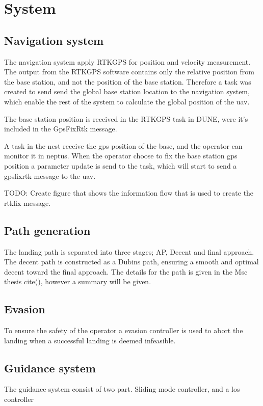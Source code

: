 \chapter{System}

\section{Navigation system}
The navigation system apply RTKGPS for position and velocity measurement. The output from the RTKGPS software contains only the relative position from the base station, and not the position of the base station. Therefore a task was created to send send the global base station location to the navigation system, which enable the rest of the system to calculate the global position of the uav. 

The base station position is received in the RTKGPS task in DUNE, were it's included in the GpsFixRtk message.

A task in the nest receive the gps position of the base, and the operator can monitor it in neptus. When the operator choose to fix the base station gps position a parameter update is send to the task, which will start to send a gpsfixrtk message to the uav. 

TODO: Create figure that shows the information flow that is used to create the rtkfix message.

\section{Path generation}
The landing path is separated into three stages; AP, Decent and final approach. The decent path is constructed as a Dubins path, ensuring a smooth and optimal decent toward the final approach. The details for the path is given in the Msc thesis cite(), however a summary will be given.

\section{Evasion}
To ensure the safety of the operator a evasion controller is used to abort the landing when a successful landing is deemed infeasible.

\section{Guidance system}
The guidance system consist of two part. Sliding mode controller, and a los controller

